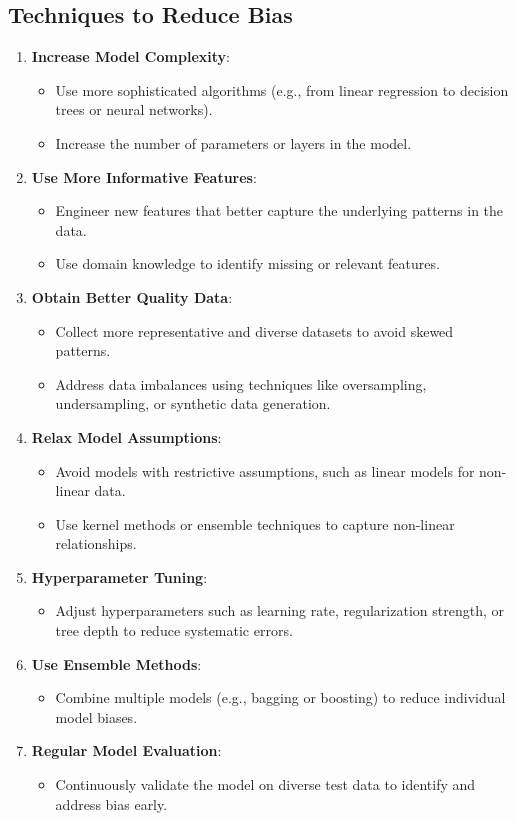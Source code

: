 \subsection*{Techniques to Reduce Bias}
\begin{enumerate}
    \item \textbf{Increase Model Complexity}:
    \begin{itemize}
        \item Use more sophisticated algorithms (e.g., from linear regression to decision trees or neural networks).
        \item Increase the number of parameters or layers in the model.
    \end{itemize}
    \item \textbf{Use More Informative Features}:
    \begin{itemize}
        \item Engineer new features that better capture the underlying patterns in the data.
        \item Use domain knowledge to identify missing or relevant features.
    \end{itemize}
    \item \textbf{Obtain Better Quality Data}:
    \begin{itemize}
        \item Collect more representative and diverse datasets to avoid skewed patterns.
        \item Address data imbalances using techniques like oversampling, undersampling, or synthetic data generation.
    \end{itemize}
    \item \textbf{Relax Model Assumptions}:
    \begin{itemize}
        \item Avoid models with restrictive assumptions, such as linear models for non-linear data.
        \item Use kernel methods or ensemble techniques to capture non-linear relationships.
    \end{itemize}
    \item \textbf{Hyperparameter Tuning}:
    \begin{itemize}
        \item Adjust hyperparameters such as learning rate, regularization strength, or tree depth to reduce systematic errors.
    \end{itemize}
    \item \textbf{Use Ensemble Methods}:
    \begin{itemize}
        \item Combine multiple models (e.g., bagging or boosting) to reduce individual model biases.
    \end{itemize}
    \item \textbf{Regular Model Evaluation}:
    \begin{itemize}
        \item Continuously validate the model on diverse test data to identify and address bias early.
    \end{itemize}
\end{enumerate}

